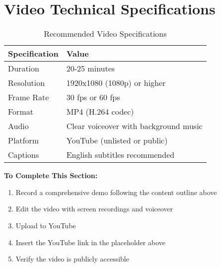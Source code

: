 \section{Video Technical Specifications}
\label{sec:video-specs}

\begin{table}[H]
\centering
\caption{Recommended Video Specifications}
\label{tab:video-specs}
\begin{tabular}{@{}ll@{}}
\toprule
\textbf{Specification} & \textbf{Value} \\
\midrule
Duration & 20-25 minutes \\
Resolution & 1920x1080 (1080p) or higher \\
Frame Rate & 30 fps or 60 fps \\
Format & MP4 (H.264 codec) \\
Audio & Clear voiceover with background music \\
Platform & YouTube (unlisted or public) \\
Captions & English subtitles recommended \\
\bottomrule
\end{tabular}
\end{table}

\begin{warningbox}
\textbf{To Complete This Section:}
\begin{enumerate}
    \item Record a comprehensive demo following the content outline above
    \item Edit the video with screen recordings and voiceover
    \item Upload to YouTube
    \item Insert the YouTube link in the placeholder above
    \item Verify the video is publicly accessible
\end{enumerate}
\end{warningbox}
